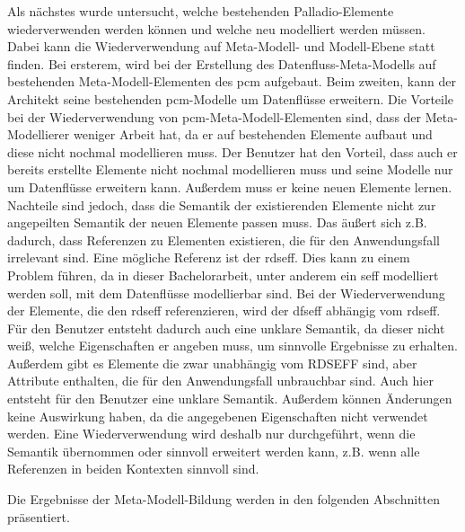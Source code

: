 Als nächstes wurde untersucht, welche bestehenden Palladio-Elemente wiederverwenden werden können und welche neu modelliert werden müssen. Dabei kann die Wiederverwendung auf Meta-Modell- und Modell-Ebene statt finden. Bei ersterem, wird bei der Erstellung des Datenfluss-Meta-Modells auf bestehenden Meta-Modell-Elementen des \gls{pcm} aufgebaut. Beim zweiten, kann der Architekt seine bestehenden \gls{pcm}-Modelle um Datenflüsse erweitern. Die Vorteile bei der Wiederverwendung von \gls{pcm}-Meta-Modell-Elementen sind, dass der Meta-Modellierer weniger Arbeit hat, da er auf bestehenden Elemente aufbaut und diese nicht nochmal modellieren muss. Der Benutzer hat den Vorteil, dass auch er bereits erstellte Elemente nicht nochmal modellieren muss und seine Modelle nur um Datenflüsse erweitern kann. Außerdem muss er keine neuen Elemente lernen. Nachteile sind jedoch, dass die Semantik der existierenden Elemente nicht zur angepeilten Semantik der neuen Elemente passen muss. Das äußert sich z.B. dadurch, dass Referenzen zu Elementen existieren, die für den Anwendungsfall irrelevant sind. Eine mögliche Referenz ist der \gls{rdseff}. Dies kann zu einem Problem führen, da in dieser Bachelorarbeit, unter anderem ein \gls{seff} modelliert werden soll, mit dem Datenflüsse modellierbar sind. Bei der Wiederverwendung der Elemente, die den \gls{rdseff} referenzieren, wird der \gls{dfseff} abhängig vom \gls{rdseff}. Für den Benutzer entsteht dadurch auch eine unklare Semantik, da dieser nicht weiß, welche Eigenschaften er angeben muss, um sinnvolle Ergebnisse zu erhalten. Außerdem gibt es Elemente die zwar unabhängig vom RDSEFF sind, aber Attribute enthalten, die für den Anwendungsfall unbrauchbar sind. Auch hier entsteht für den Benutzer eine unklare Semantik. Außerdem können Änderungen keine Auswirkung haben, da die angegebenen Eigenschaften nicht verwendet werden. Eine Wiederverwendung wird deshalb nur durchgeführt, wenn die Semantik übernommen oder sinnvoll erweitert werden kann, z.B. wenn alle Referenzen in beiden Kontexten sinnvoll sind. \par
Die Ergebnisse der Meta-Modell-Bildung werden in den folgenden Abschnitten präsentiert. 

